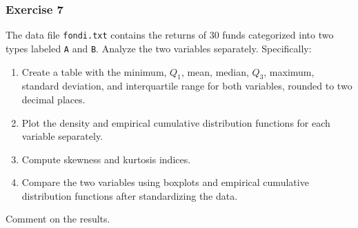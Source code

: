 \documentclass[
]{article}
\providecommand{\tightlist}{%
  \setlength{\itemsep}{0pt}\setlength{\parskip}{0pt}}
\begin{document}
\hypertarget{exercise-7}{%
\subsubsection{Exercise 7}\label{exercise-7}}

The data file \texttt{fondi.txt} contains the returns of 30 funds
categorized into two types labeled \texttt{A} and \texttt{B}. Analyze
the two variables separately. Specifically:

\begin{enumerate}
\def\labelenumi{\arabic{enumi}.}
\tightlist
\item
  Create a table with the minimum, \(Q_1\), mean, median, \(Q_3\),
  maximum, standard deviation, and interquartile range for both
  variables, rounded to two decimal places.
\item
  Plot the density and empirical cumulative distribution functions for
  each variable separately.
\item
  Compute skewness and kurtosis indices.
\item
  Compare the two variables using boxplots and empirical cumulative
  distribution functions after standardizing the data.
\end{enumerate}

Comment on the results.
\end{document}
